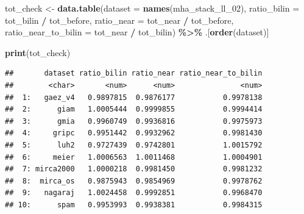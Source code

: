 \documentclass[
  11pt,
]{article}
\newenvironment{Shaded}{\begin{snugshade}}{\end{snugshade}}
\newcommand{\AttributeTok}[1]{\textcolor[rgb]{0.13,0.29,0.53}{#1}}
\newcommand{\FunctionTok}[1]{\textcolor[rgb]{0.13,0.29,0.53}{\textbf{#1}}}
\newcommand{\NormalTok}[1]{#1}
\newcommand{\OtherTok}[1]{\textcolor[rgb]{0.56,0.35,0.01}{#1}}
\newcommand{\SpecialCharTok}[1]{\textcolor[rgb]{0.81,0.36,0.00}{\textbf{#1}}}
\begin{document}
\begin{Shaded}
\begin{Highlighting}[]
\NormalTok{tot\_check }\OtherTok{\textless{}{-}} \FunctionTok{data.table}\NormalTok{(}\AttributeTok{dataset =} \FunctionTok{names}\NormalTok{(mha\_stack\_ll\_02),}
                        \AttributeTok{ratio\_bilin =}\NormalTok{ tot\_bilin }\SpecialCharTok{/}\NormalTok{ tot\_before,}
                        \AttributeTok{ratio\_near  =}\NormalTok{ tot\_near  }\SpecialCharTok{/}\NormalTok{ tot\_before,}
                        \AttributeTok{ratio\_near\_to\_bilin =}\NormalTok{ tot\_near }\SpecialCharTok{/}\NormalTok{ tot\_bilin) }\SpecialCharTok{\%\textgreater{}\%}
\NormalTok{  .[}\FunctionTok{order}\NormalTok{(dataset)]}

\FunctionTok{print}\NormalTok{(tot\_check)}
\end{Highlighting}
\end{Shaded}

\begin{verbatim}
##       dataset ratio_bilin ratio_near ratio_near_to_bilin
##        <char>       <num>      <num>               <num>
##  1:   gaez_v4   0.9897815  0.9876177           0.9978138
##  2:      giam   1.0005444  0.9999855           0.9994414
##  3:      gmia   0.9960749  0.9936816           0.9975973
##  4:     gripc   0.9951442  0.9932962           0.9981430
##  5:      luh2   0.9727439  0.9742801           1.0015792
##  6:     meier   1.0006563  1.0011468           1.0004901
##  7: mirca2000   1.0000218  0.9981450           0.9981232
##  8:  mirca_os   0.9875943  0.9854969           0.9978762
##  9:   nagaraj   1.0024458  0.9992851           0.9968470
## 10:      spam   0.9953993  0.9938381           0.9984315
\end{verbatim}
\end{document}
